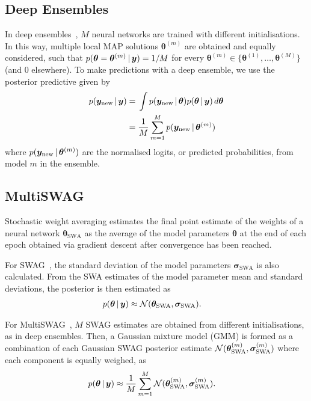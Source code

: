 \subsection{Deep Ensembles}

In deep ensembles~\cite{lakshminarayanan2017simple}, \(M\) neural networks are trained with different initialisations.
In this way, multiple local MAP solutions \(\bm\theta^{(m)}\) are obtained and equally considered, such that \(p(\bm \theta = \bm \theta^{(m)} \, | \, \bm y) = 1 / M\) for every \(\bm \theta^{(m)} \in \{\bm\theta^{(1)}, \ldots, \bm\theta^{(M)}\}\) (and 0 elsewhere).
To make predictions with a deep ensemble, we use the posterior predictive given by
\begin{align}
    p(\bm y_{\mathrm{new}} \, | \, \bm y)
    ={} & \int p(\bm y_{\mathrm{new}} \, | \, \bm \theta) p(\bm \theta \, | \, \bm y)\,d\bm\theta \nonumber \\
    ={} & \frac{1}{M} \sum_{m=1}^M p(\bm y_{\mathrm{new}} \, | \, \bm\theta^{(m)})
\end{align}
where \(p(\bm y_{\mathrm{new}} \, | \, \bm\theta^{(m)})\) are the normalised logits, or predicted probabilities, from model \(m\) in the ensemble.

\subsection{MultiSWAG}

Stochastic weight averaging estimates the final point estimate of the weights of a neural network \(\bm \theta_\mathrm{SWA}\) as the average of the model parameters \(\bm \theta\) at the end of each epoch obtained via gradient descent after convergence has been reached.

For SWAG~\cite{maddox2019simple}, the standard deviation of the model parameters \(\bm \sigma_\mathrm{SWA}\) is also calculated.
From the SWA estimates of the model parameter mean and standard deviations, the posterior is then estimated as
\begin{align}\label{eq:swag}
    p(\bm \theta \, | \, \bm y) \approx{} & \mathcal{N}(\bm \theta_\mathrm{SWA}, \bm \sigma_\mathrm{SWA}).
\end{align}

For MultiSWAG~\cite{wilson2020bayesian}, \(M\) SWAG estimates are obtained from different initialisations, as in deep ensembles.
Then, a Gaussian mixture model (GMM) is formed as a combination of each Gaussian SWAG posterior estimate \(\mathcal{N}(\bm \theta_\mathrm{SWA}^{(m)}, \bm \sigma_\mathrm{SWA}^{(m)})\) where each component is equally weighed, as
\begin{align}\label{eq:multiswag}
    p(\bm \theta \, | \, \bm y) \approx{} & \frac{1}{M} \sum_{m=1}^M \mathcal{N}(\bm \theta_\mathrm{SWA}^{(m)}, \bm \sigma_\mathrm{SWA}^{(m)}).
\end{align}

